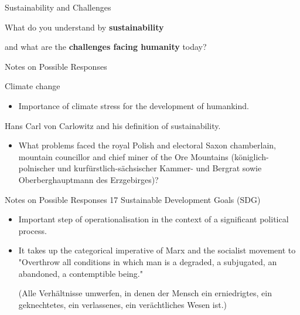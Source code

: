 \documentclass{beamer}
\title{Modelling Sustainable Systems\\ and Semantic Web\\[6pt]
  Systems, Sustainability, Development
  \vskip1em}
\subtitle{Lecture in the Module 10-202-2309\\ for Master Computer Science}
\author{Prof. Dr. Hans-Gert Gräbe\\
\url{http://www.informatik.uni-leipzig.de/~graebe}}
\date{October 2021}
\begin{document}
{
\begin{frame}
  \titlepage
\end{frame}}

\begin{frame}{Sustainability and Challenges}\LARGE

  What do you understand by \textbf{sustainability}

  and what are the \textbf{challenges facing humanity} today? 

\end{frame}

\begin{frame}{Notes on Possible Responses}

Climate change
\begin{itemize}
\item Importance of climate stress for the development of humankind.
\end{itemize}

Hans Carl von Carlowitz and his definition of sustainability.
\begin{itemize}
\item What problems faced the royal Polish and electoral Saxon chamberlain,
  mountain councillor and chief miner of the Ore Mountains
  (königlich-polnischer und kurfürstlich-sächsischer Kammer- und Bergrat sowie
  Oberberghauptmann des Erzgebirges)?
\end{itemize}
\end{frame}

\begin{frame}{Notes on Possible Responses}
17 Sustainable Development Goals (SDG) 
\begin{itemize}
\item Important step of operationalisation in the context of a significant
  political process.
\item It takes up the categorical imperative of Marx and the socialist
  movement to "Overthrow all conditions in which man is a degraded, a
  subjugated, an abandoned, a contemptible being."\medskip

  (Alle Verhältnisse umwerfen, in denen der Mensch ein erniedrigtes, ein
  geknechtetes, ein verlassenes, ein verächtliches Wesen ist.)
\end{itemize}
\end{frame}
\end{document}
